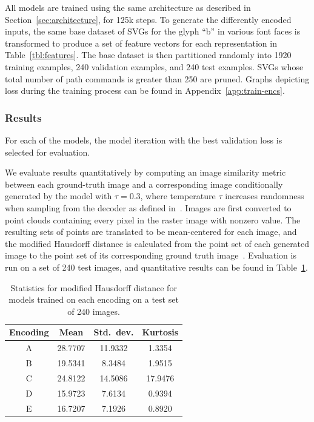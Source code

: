 All models are trained using the same architecture as described in Section~\ref{sec:architecture}, for 125k steps.
To generate the differently encoded inputs, the same base dataset of SVGs for the glyph ``b'' in various font faces is transformed to produce a set of feature vectors for each representation in Table~\ref{tbl:features}.
The base dataset is then partitioned randomly into 1920 training examples, 240 validation examples, and 240 test examples.
SVGs whose total number of path commands is greater than 250 are pruned.
Graphs depicting loss during the training process can be found in Appendix~\ref{app:train-encs}.

\subsubsection{Results}
For each of the models, the model iteration with the best validation loss is selected for evaluation.

We evaluate results quantitatively by computing an image similarity metric between each ground-truth image and a corresponding image conditionally generated by the model with $\tau = 0.3$, where temperature $\tau$ increases randomness when sampling from the decoder as defined in~\cite{ha2017neural}.
Images are first converted to point clouds containing every pixel in the raster image with nonzero value.
The resulting sets of points are translated to be mean-centered for each image, and the modified Hausdorff distance is calculated from the point set of each generated image to the point set of its corresponding ground truth image~\cite{dubuisson1994modified}.
Evaluation is run on a set of 240 test images, and quantitative results can be found in Table~\ref{tbl:encoding-results}.

\begin{table}[t]
\centering
\caption[Quantitative results for evaluating feature encodings]{Statistics for modified Hausdorff distance for models trained on each encoding on a test set of 240 images.\label{tbl:encoding-results}}
\begin{tabular}{c c c c}
\toprule
    Encoding & Mean & Std.\ dev. & Kurtosis \\ \midrule
    A & 28.7707 & 11.9332 & 1.3354 \\
    B & 19.5341 & 8.3484 & 1.9515 \\
    C & 24.8122 & 14.5086 & 17.9476 \\
    D & 15.9723 & 7.6134 & 0.9394 \\
    E & 16.7207 & 7.1926 & 0.8920 \\
\end{tabular}
\end{table}

